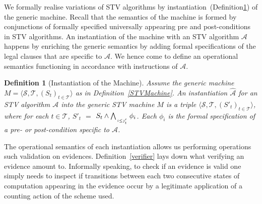 \documentclass[10pt,conference]{IEEEtran}
\newtheorem{definition}{Definition}
\begin{document}
We formally realise variations of STV algorithms by instantiation~(Definition\ref{STVInst}) of the generic machine. Recall that the semantics of the machine is formed by conjunctions of formally specified universally appearing pre and post-conditions in STV algorithms. An instantiation of the machine with an STV algorithm $\mathcal{A}$ happens by enriching the generic semantics by adding formal specifications of the legal clauses that are specific to $\mathcal{A}$. We hence come to define an operational semantics functioning in accordance with instructions of $\mathcal{A}$. 
\begin{definition}[Instantiation of the Machine]\label{STVInst}
Assume the generic machine $M = \langle \mathcal{S}, \mathcal{T}, (S_t)_{t \in \mathcal{T}} \rangle$ as in Definition~\ref{STVMachine}. An instantiation $\hat{\mathcal{A}}$ for an STV algorithm $\mathcal{A}$ into the generic STV machine $M$ is a triple $\langle \mathcal{S}, \mathcal{T}, (S'_t)_{t \in \mathcal{T}} \rangle$, where for each $t\in\mathcal{T}$, $S'_{t}$ $=$ $S_{t}\wedge\bigwedge_{\atop{i\leq j'_{t}}} \phi_{i}$. Each $\phi_{i}$ is the formal specification of a pre- or post-condition specific to $\mathcal{A}$.   
\end{definition}

The operational semantics of each instantiation allows us performing operations such validation on evidences. Definition~\ref{verifier} lays down what verifying an evidence amount to. Informally speaking, to check if an evidence is valid one simply needs to inspect if transitions  between each two consecutive states of computation appearing in the evidence occur by a legitimate application of a counting action of the scheme used.
\end{document}
